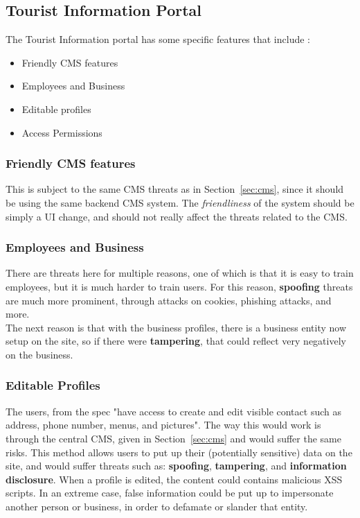 \documentclass{article}
\numberwithin{equation}{section} %
\numberwithin{figure}{section} %
\numberwithin{table}{section} %
\begin{document}
\subsection{Tourist Information Portal}
The Tourist Information portal has some specific features that include : 
\begin{itemize}
	\item Friendly CMS features
	\item Employees and Business
	\item Editable profiles
	\item Access Permissions
\end{itemize}

\subsubsection{Friendly CMS features}
This is subject to the same CMS threats as in Section~\ref{sec:cms}, since it should be using the same backend CMS system.  The \textit{friendliness} of the system should be simply a UI change, and should not really affect the threats related to the CMS.  

\subsubsection{Employees and Business}
There are threats here for multiple reasons, one of which is that it is easy to train employees, but it is much harder to train users.  For this reason, \textbf{spoofing} threats are much more prominent, through attacks on cookies, phishing attacks, and more.\\

The next reason is that with the business profiles, there is a business entity now setup on the site, so if there were \textbf{tampering}, that could reflect very negatively on the business.

\subsubsection{Editable Profiles}
The users, from the spec "have access to create and edit visible contact such as 
address, phone number, menus, and pictures".\cite{spec}  The way this would work is through the central CMS, given in Section~\ref{sec:cms} and would suffer the same risks.  This method allows users to put up their (potentially sensitive) data on the site, and would suffer threats such as: \textbf{spoofing}, \textbf{tampering}, and \textbf{information disclosure}.  When a profile is edited, the content could contains malicious XSS scripts. In an extreme case, false information could be put up to impersonate another person or business, in order to defamate or slander that entity.
\end{document}
